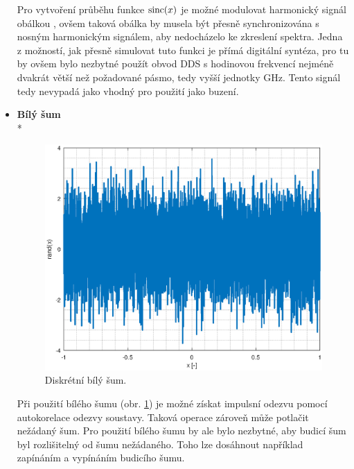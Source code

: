 \begin{itemize}
	Pro vytvoření průběhu funkce $\operatorname{sinc}(x)$ je možné modulovat harmonický signál obálkou \cite{sincgausstdr}, ovšem taková obálka by musela být přesně synchronizována s nosným harmonickým signálem, aby nedocházelo ke zkreslení spektra. Jedna z možností, jak přesně simulovat tuto funkci je přímá digitální syntéza, pro tu by ovšem bylo nezbytné použít obvod \acrshort{DDS} s hodinovou frekvencí nejméně dvakrát větší než požadované pásmo, tedy vyšší jednotky GHz. Tento signál tedy nevypadá jako vhodný pro použití jako buzení.
	
	\item
	\textbf{Bílý šum}\\*	
	\begin{figure}[htbp]\includegraphics[width=\textwidth,keepaspectratio]{images/whitenoise.eps}\caption{Diskrétní bílý šum.}\label{whitenoise}\end{figure}			
	Při použití bílého šumu (obr. \ref{whitenoise}) je možné získat impulsní odezvu pomocí autokorelace odezvy soustavy. Taková operace zároveň může potlačit nežádaný šum. Pro použití bílého šumu by ale bylo nezbytné, aby budicí šum byl rozlišitelný od šumu nežádaného. Toho lze dosáhnout například zapínáním a vypínáním budicího šumu.
	

\end{itemize}
